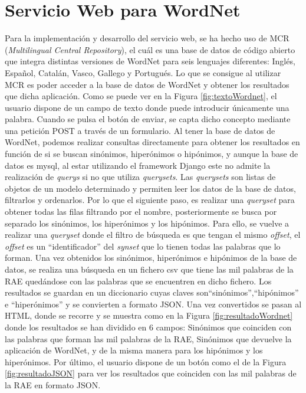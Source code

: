 \section{Servicio Web para WordNet}
\label{cap:sec:servicioWordnet}

Para la implementación y desarrollo del servicio web, se ha hecho uso de MCR (\textit{Multilingual Central Repository}), el cuál es una base de datos de código abierto que integra distintas versiones de WordNet para seis lenguajes diferentes: Inglés, Español, Catalán, Vasco, Gallego y Portugués. 
Lo que se consigue al utilizar MCR es poder acceder a la base de datos de WordNet y obtener los resultados que dicha aplicación.
Como se puede ver en la Figura \ref{fig:textoWordnet}, el usuario dispone de un campo de texto donde puede introducir únicamente una palabra. Cuando se pulsa el botón de enviar, se capta dicho concepto mediante una petición POST a través de un formulario.
Al tener la base de datos de WordNet, podemos realizar consultas directamente para obtener los resultados en función de si se buscan sinónimos, hiperónimos o hipónimos, y aunque la base de datos es mysql, al estar utilizando el framework Django este no admite la realización de \textit{querys} si no que utiliza \textit{querysets}.  Las \textit{querysets} son listas de objetos de un modelo determinado y permiten leer los datos de la base de datos, filtrarlos y ordenarlos.
Por lo que el siguiente paso, es realizar una \textit{queryset} para obtener todas las filas filtrando por el nombre, posteriormente se busca por separado los sinónimos, los hiperónimos y los hipónimos. Para ello, se vuelve a realizar una \textit{queryset} donde el filtro de búsqueda es que tengan el mismo \textit{offset}, el \textit{offset} es un ``identificador'' del \textit{synset} que lo tienen todas las palabras que lo forman.
Una vez obtenidos los sinónimos, hiperónimos e hipónimos de la base de datos, se realiza una búsqueda en un fichero csv que tiene las mil palabras de la RAE quedándose con las palabras que se encuentren en dicho fichero.
Los resultados se guardan en un diccionario cuyas claves son``sinónimos'',``hipónimos'' e ``hiperónimos'' y se convierten a formato JSON. Una vez convertidos se pasan al HTML, donde se recorre y se muestra como en la Figura \ref{fig:resultadoWordnet} donde los resultados se han dividido en 6 campos: Sinónimos que coinciden con las palabras que forman las mil palabras de la RAE, Sinónimos que devuelve la aplicación de WordNet, y de la misma manera para los hipónimos y los hiperónimos.
Por último, el usuario dispone de un botón como el de la Figura \ref{fig:resultadoJSON} para ver los resultados que coinciden con las mil palabras de la RAE en formato JSON.


